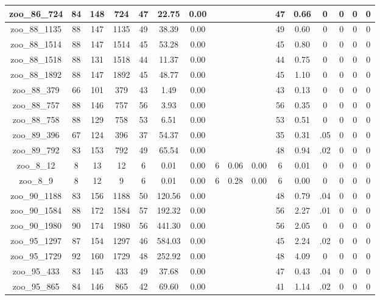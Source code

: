 \begin{landscape}
\begin{longtable}{|c|c|c|c|c|c|c|c|c|c|c|c|c|c|c|c|}
zoo\_86\_724 & 84 & 148 & 724 & 47 & 22.75 & 0.00 &  &  &  & 47 & 0.66 & 0 & 0 & 0 & 0 \\ \hline 
zoo\_88\_1135 & 88 & 147 & 1135 & 49 & 38.39 & 0.00 &  &  &  & 49 & 0.60 & 0 & 0 & 0 & 0 \\ \hline 
zoo\_88\_1514 & 88 & 147 & 1514 & 45 & 53.28 & 0.00 &  &  &  & 45 & 0.80 & 0 & 0 & 0 & 0 \\ \hline 
zoo\_88\_1518 & 88 & 131 & 1518 & 44 & 11.37 & 0.00 &  &  &  & 44 & 0.75 & 0 & 0 & 0 & 0 \\ \hline 
zoo\_88\_1892 & 88 & 147 & 1892 & 45 & 48.77 & 0.00 &  &  &  & 45 & 1.10 & 0 & 0 & 0 & 0 \\ \hline 
zoo\_88\_379 & 66 & 101 & 379 & 43 & 1.49 & 0.00 &  &  &  & 43 & 0.13 & 0 & 0 & 0 & 0 \\ \hline 
zoo\_88\_757 & 88 & 146 & 757 & 56 & 3.93 & 0.00 &  &  &  & 56 & 0.35 & 0 & 0 & 0 & 0 \\ \hline 
zoo\_88\_758 & 88 & 129 & 758 & 53 & 6.51 & 0.00 &  &  &  & 53 & 0.51 & 0 & 0 & 0 & 0 \\ \hline 
zoo\_89\_396 & 67 & 124 & 396 & 37 & 54.37 & 0.00 &  &  &  & 35 & 0.31 & .05 & 0 & 0 & 0 \\ \hline 
zoo\_89\_792 & 83 & 153 & 792 & 49 & 65.54 & 0.00 &  &  &  & 48 & 0.94 & .02 & 0 & 0 & 0 \\ \hline 
zoo\_8\_12 & 8 & 13 & 12 & 6 & 0.01 & 0.00 & 6 & 0.06 & 0.00 & 6 & 0.01 & 0 & 0 & 0 & 0 \\ \hline 
zoo\_8\_9 & 8 & 12 & 9 & 6 & 0.01 & 0.00 & 6 & 0.28 & 0.00 & 6 & 0.00 & 0 & 0 & 0 & 0 \\ \hline 
zoo\_90\_1188 & 83 & 156 & 1188 & 50 & 120.56 & 0.00 &  &  &  & 48 & 0.79 & .04 & 0 & 0 & 0 \\ \hline 
zoo\_90\_1584 & 88 & 172 & 1584 & 57 & 192.32 & 0.00 &  &  &  & 56 & 2.27 & .01 & 0 & 0 & 0 \\ \hline 
zoo\_90\_1980 & 90 & 174 & 1980 & 56 & 441.30 & 0.00 &  &  &  & 56 & 2.05 & 0 & 0 & 0 & 0 \\ \hline 
zoo\_95\_1297 & 87 & 154 & 1297 & 46 & 584.03 & 0.00 &  &  &  & 45 & 2.24 & .02 & 0 & 0 & 0 \\ \hline 
zoo\_95\_1729 & 92 & 160 & 1729 & 48 & 252.92 & 0.00 &  &  &  & 48 & 4.09 & 0 & 0 & 0 & 0 \\ \hline 
zoo\_95\_433 & 83 & 145 & 433 & 49 & 37.68 & 0.00 &  &  &  & 47 & 0.43 & .04 & 0 & 0 & 0 \\ \hline 
zoo\_95\_865 & 84 & 146 & 865 & 42 & 69.60 & 0.00 &  &  &  & 41 & 1.14 & .02 & 0 & 0 & 0 \\ \hline 

\end{longtable}
\end{landscape}
